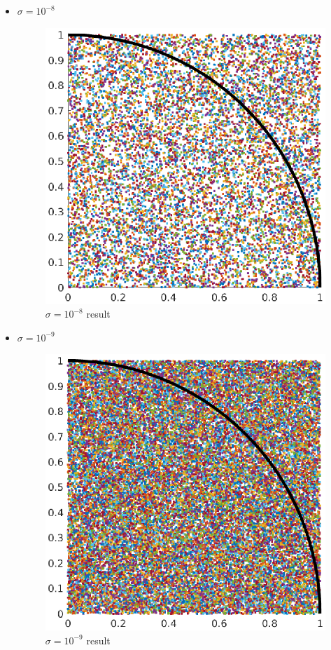 \begin{itemize}
\begin{figure}[H]
   \end{figure}
    \item $\sigma = 10^{-8}$
    \begin{figure}[H] 
        \caption{$\sigma = 10^{-8}$ result} 
        \centering 
        \includegraphics[width=12cm]{../Figure/Bonus/mont1e-08.eps} 
   \end{figure}
    \item $\sigma = 10^{-9}$
    \begin{figure}[H] 
        \caption{$\sigma = 10^{-9}$ result} 
        \centering 
        \includegraphics[width=12cm]{../Figure/Bonus/mont1e-09.eps} 
   \end{figure}
\end{itemize}